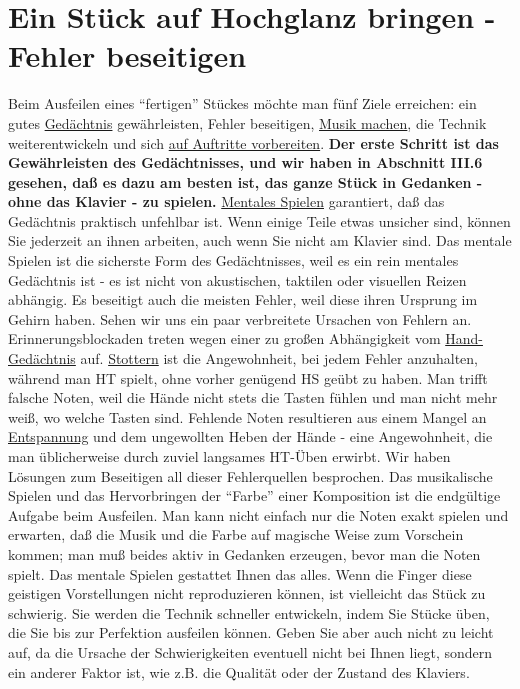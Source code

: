 
\section{Ein Stück auf Hochglanz bringen - Fehler beseitigen}\hypertarget{c1iii9}{}

Beim Ausfeilen eines \enquote{fertigen} Stückes möchte man fünf Ziele erreichen: ein gutes \hyperlink{c1iii6}{Gedächtnis} gewährleisten, Fehler beseitigen, \hyperlink{c1iii14d}{Musik machen}, die Technik weiterentwickeln und sich \hyperlink{c1iii14}{auf Auftritte vorbereiten}.
\textbf{Der erste Schritt ist das Gewährleisten des Gedächtnisses, und wir haben in Abschnitt III.6 gesehen, daß es dazu am besten ist, das ganze Stück in Gedanken - ohne das Klavier - zu spielen.}
\hyperlink{c1ii12}{Mentales Spielen} garantiert, daß das Gedächtnis praktisch unfehlbar ist.
Wenn einige Teile etwas unsicher sind, können Sie jederzeit an ihnen arbeiten, auch wenn Sie nicht am Klavier sind.
Das mentale Spielen ist die sicherste Form des Gedächtnisses, weil es ein rein mentales Gedächtnis ist - es ist nicht von akustischen, taktilen oder visuellen Reizen abhängig.
Es beseitigt auch die meisten Fehler, weil diese ihren Ursprung im Gehirn haben.
Sehen wir uns ein paar verbreitete Ursachen von Fehlern an.
Erinnerungsblockaden treten wegen einer zu großen Abhängigkeit vom \hyperlink{c1iii6hand}{Hand-Gedächtnis} auf.
\hyperlink{c1ii22}{Stottern} ist die Angewohnheit, bei jedem Fehler anzuhalten, während man HT spielt, ohne vorher genügend HS geübt zu haben.
Man trifft falsche Noten, weil die Hände nicht stets die Tasten fühlen und man nicht mehr weiß, wo welche Tasten sind.
Fehlende Noten resultieren aus einem Mangel an \hyperlink{c1ii14}{Entspannung} und dem ungewollten Heben der Hände - eine Angewohnheit, die man üblicherweise durch zuviel langsames HT-Üben erwirbt.
Wir haben Lösungen  zum Beseitigen all dieser Fehlerquellen besprochen.
Das musikalische Spielen und das Hervorbringen der \enquote{Farbe} einer Komposition ist die endgültige Aufgabe beim Ausfeilen.
Man kann nicht einfach nur die Noten exakt spielen und erwarten, daß die Musik und die Farbe auf magische Weise zum Vorschein kommen; man muß beides aktiv in Gedanken erzeugen, bevor man die Noten spielt.
Das mentale Spielen gestattet Ihnen das alles.
Wenn die Finger diese geistigen Vorstellungen nicht reproduzieren können, ist vielleicht das Stück zu schwierig.
Sie werden die Technik schneller entwickeln, indem Sie Stücke üben, die Sie bis zur Perfektion ausfeilen können.
Geben Sie aber auch nicht zu leicht auf, da die Ursache der Schwierigkeiten eventuell nicht bei Ihnen liegt, sondern ein anderer Faktor ist, wie z.B. die Qualität oder der Zustand des Klaviers.

